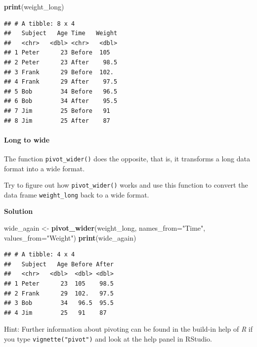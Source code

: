 \documentclass[
]{scrartcl}
\makeatletter
\newenvironment{Shaded}{\begin{snugshade}}{\end{snugshade}}
\newcommand{\AttributeTok}[1]{\textcolor[rgb]{0.13,0.29,0.53}{#1}}
\newcommand{\FunctionTok}[1]{\textcolor[rgb]{0.13,0.29,0.53}{\textbf{#1}}}
\newcommand{\NormalTok}[1]{#1}
\newcommand{\OtherTok}[1]{\textcolor[rgb]{0.56,0.35,0.01}{#1}}
\newcommand{\StringTok}[1]{\textcolor[rgb]{0.31,0.60,0.02}{#1}}
\newenvironment{kframe}{%
\medskip{}
\setlength{\fboxsep}{.8em}
 \def\at@end@of@kframe{}%
 \ifinner\ifhmode%
  \def\at@end@of@kframe{\end{minipage}}%
  \begin{minipage}{\columnwidth}%
 \fi\fi%
 \def\FrameCommand##1{\hskip\@totalleftmargin \hskip-\fboxsep
 \colorbox{shadecolor}{##1}\hskip-\fboxsep
     \hskip-\linewidth \hskip-\@totalleftmargin \hskip\columnwidth}%
 \MakeFramed {\advance\hsize-\width
   \@totalleftmargin\z@ \linewidth\hsize
   \@setminipage}}%
 {\par\unskip\endMakeFramed%
 \at@end@of@kframe}
\newenvironment{rmdblock}[1]
  {
  \begin{itemize}
  \renewcommand{\labelitemi}{
    \raisebox{-.7\height}[0pt][0pt]{
      {\setkeys{Gin}{width=3em,keepaspectratio}\texttt{[image: images/\#1]}}
    }
  }
  \setlength{\fboxsep}{1em}
  \begin{kframe}
  \item
  }
  {
  \end{kframe}
  \end{itemize}
  }
\newenvironment{myexercise}
    {\begin{rmdblock}{exercise_green}}
    {\end{rmdblock}}
\newenvironment{webexsolution}[1]
    {\par\tiny\textbf{#1}}
    {\par}
\newcommand{\webexhide}[1]{\begin{webexsolution}{#1}}
\newcommand{\webexunhide}{\end{webexsolution}}
\makeatother
\begin{document}
\begin{Shaded}
\begin{Highlighting}[]
\FunctionTok{print}\NormalTok{(weight\_long)}
\end{Highlighting}
\end{Shaded}

\begin{verbatim}
## # A tibble: 8 x 4
##   Subject   Age Time   Weight
##   <chr>   <dbl> <chr>   <dbl>
## 1 Peter      23 Before  105  
## 2 Peter      23 After    98.5
## 3 Frank      29 Before  102. 
## 4 Frank      29 After    97.5
## 5 Bob        34 Before   96.5
## 6 Bob        34 After    95.5
## 7 Jim        25 Before   91  
## 8 Jim        25 After    87
\end{verbatim}

\paragraph*{Long to wide}\label{long-to-wide}

The function \texttt{pivot\_wider()} does the opposite, that is, it transforms a long data format into a wide format.

\begin{myexercise}
Try to figure out how \texttt{pivot\_wider()} works and use this
function to convert the data frame \texttt{weight\_long} back to a wide
format.
\end{myexercise}
\webexhide{Solution}

\begin{Shaded}
\begin{Highlighting}[]
\NormalTok{wide\_again }\OtherTok{\textless{}{-}} \FunctionTok{pivot\_wider}\NormalTok{(weight\_long, }\AttributeTok{names\_from=}\StringTok{"Time"}\NormalTok{, }\AttributeTok{values\_from=}\StringTok{"Weight"}\NormalTok{)}
\FunctionTok{print}\NormalTok{(wide\_again)}
\end{Highlighting}
\end{Shaded}

\begin{verbatim}
## # A tibble: 4 x 4
##   Subject   Age Before After
##   <chr>   <dbl>  <dbl> <dbl>
## 1 Peter      23  105    98.5
## 2 Frank      29  102.   97.5
## 3 Bob        34   96.5  95.5
## 4 Jim        25   91    87
\end{verbatim}

\webexunhide

Hint: Further information about pivoting can be found in the build-in help of \emph{R} if you type \texttt{vignette("pivot")} and look at the help panel in RStudio.
\end{document}
